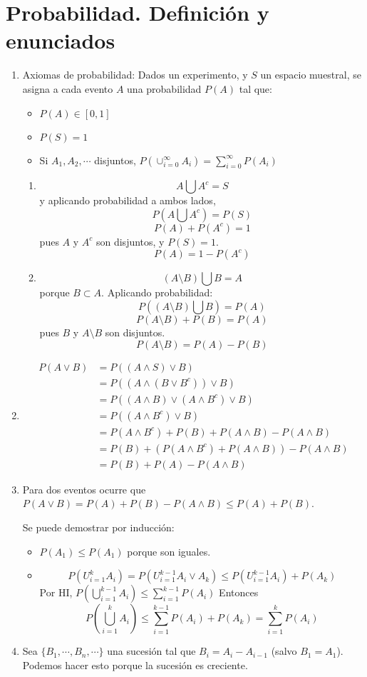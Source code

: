 \section{Probabilidad. Definición y enunciados}
\begin{enumerate}
	\item Axiomas de probabilidad: Dados un experimento, y $S$ un espacio muestral, se asigna a cada evento $A$ una probabilidad $P(A)$ tal que:
	\begin{itemize}
		\item $P(A) \in [0,1]$
		\item $P(S) = 1$
		\item Si $A_1, A_2, \cdots$ disjuntos, $P(\cup_{i=0}^{\infty} A_i) = \sum_{i=0}^{\infty}P(A_i)$
	\end{itemize}
	\begin{enumerate}
		\item
			$$A \bigcup A^c = S$$ y aplicando probabilidad a ambos lados,
			$$P(A \bigcup A^c) = P(S)$$ 
			$$P(A) + P(A^c) = 1$$ pues $A$ y $A^c$ son disjuntos, y $P(S)=1$. 
			$$P(A) = 1 - P(A^c)$$ 
		\item 
			$$(A\setminus B) \bigcup B = A$$ porque $B\subset A$. Aplicando probabilidad:
			$$P((A\setminus B) \bigcup B) = P(A)$$
			$$P(A\setminus B) + P(B) = P(A)$$ pues $B$ y $A\setminus B$ son disjuntos.
			$$P(A\setminus B)= P(A) - P(B)$$
	\end{enumerate}
	\item
		\begin{align*}
			P(A\lor B)	& = P((A\land S)\lor B)									\\
						& = P((A\land (B\lor B^c))\lor B)						\\
						& = P((A\land B) \lor (A\land B^c) \lor B)				\\
						& = P((A\land B^c) \lor B)								\\
						& = P(A\land B^c) + P(B) + P(A\land B) - P(A\land B)	\\
						& = P(B) + (P(A\land B^c) + P(A\land B)) - P(A\land B)	\\
						& = P(B) + P(A) - P(A\land B)
		\end{align*}
	\item
		Para dos eventos ocurre que $P(A\lor B) = P(A) + P(B) - P(A\land B) \leq P(A) + P(B)$.
		
		Se puede demostrar por inducción:
			\begin{itemize}
				\item $P(A_1) \leq P(A_1)$ porque son iguales.
				\item $$P(U_{i=1}^kA_i) = P(U_{i=1}^{k-1}A_i \lor A_k) \leq P(U_{i=1}^{k-1}A_i) + P(A_k)$$
					Por HI, $P\left(\bigcup_{i=1}^{k-1}A_i\right) \leq \sum_{i=1}^{k-1}P(A_i)$
					Entonces $$P\left(\bigcup_{i=1}^kA_i\right) \leq \sum_{i=1}^{k-1}P(A_i) + P(A_k) = \sum_{i=1}^kP(A_i)$$
			\end{itemize}
	\item
		Sea $\{B_1, \cdots, B_n, \cdots\}$ una sucesión tal que $B_i = A_i - A_{i-1}$ (salvo $B_1 = A_1$). Podemos hacer esto porque la sucesión es creciente.
		

\end{enumerate}
